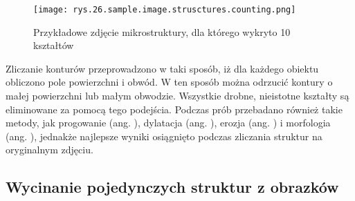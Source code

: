 \begin{figure}[h]
    \centering
    \texttt{[image: rys.26.sample.image.strusctures.counting.png]}
    \caption{Przykładowe zdjęcie mikrostruktury, dla którego wykryto 10 kształtów}
    \label{fig:mesh25}
\end{figure}
Zliczanie konturów przeprowadzono w taki sposób, iż dla każdego obiektu obliczono pole powierzchni i obwód. W ten sposób można odrzucić kontury o małej powierzchni lub małym obwodzie. Wszystkie drobne, nieistotne kształty są eliminowane za pomocą tego podejścia. Podczas prób przebadano również takie metody, jak progowanie (ang. ), dylatacja (ang. ), erozja (ang. ) i morfologia (ang. ), jednakże najlepsze wyniki osiągnięto podczas zliczania struktur na oryginalnym zdjęciu.

\subsection{Wycinanie pojedynczych struktur z obrazków}
\label{wycinanie.struktur}

